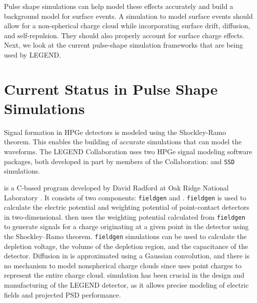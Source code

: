 Pulse shape simulations can help model these effects accurately and build a background model for surface events. A simulation to model surface events should allow for a non-spherical charge cloud while incorporating surface drift, diffusion, and self-repulsion. They should also properly account for surface charge effects. Next, we look at the current pulse-shape simulation frameworks that are being used by LEGEND.

\section{Current Status in Pulse Shape Simulations}

Signal formation in HPGe detectors is modeled using the Shockley-Ramo theorem. This enables the building of accurate simulations that can model the waveforms. The LEGEND Collaboration uses two HPGe signal modeling software packages, both developed in part by members of the Collaboration: {\siggen} and \texttt{SSD} simulations. 

{\siggen} is a C-based program developed by David Radford at Oak Ridge National Laboratory \cite{siggen_paper}. It consists of two components: \texttt{fieldgen} and {\siggen}. \texttt{fieldgen} is used to calculate the electric potential and weighting potential of point-contact detectors in two-dimensional. {\siggen} then uses the weighting potential calculated from \texttt{fieldgen} to generate signals for a charge originating at a given point in the detector using the Shockley–Ramo theorem. \texttt{fieldgen} simulations can be used to calculate the depletion voltage, the volume of the depletion region, and the capacitance of the detector. Diffusion in {\siggen} is approximated using a Gaussian convolution, and there is no mechanism to model nonspherical charge clouds since {\siggen} uses point charges to represent the entire charge cloud. {\siggen} simulation has been crucial in the design and manufacturing of the LEGEND detector, as it allows precise modeling of electric fields and projected PSD performance.




